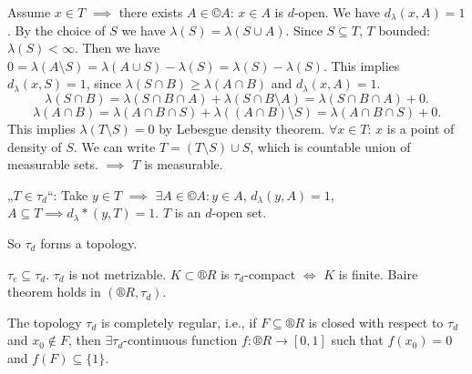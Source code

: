 \documentclass[12pt]{article}					%
\begin{document}
\begin{veta}
\begin{dukazin}
		Assume $x \in T$ $\implies$ there exists $A \in ©A$: $x \in A$ is $d$-open. We have $d_λ(x, A) = 1$. By the choice of $S$ we have $λ(S) = λ(S \cup A)$. Since $S \subseteq T$, $T$ bounded: $λ(S) < ∞$. Then we have $0 = λ(A \setminus S) = λ(A \cup S) - λ(S) = λ(S) - λ(S)$. This implies $d_λ(x, S) = 1$, since $λ(S \cap B) ≥ λ(A \cap B)$ and $d_λ(x, A) = 1$.
		$$ λ(S \cap B) = λ(S \cap B \cap A) + λ(S \cap B \setminus A) = λ(S \cap B \cap A) + 0. $$
		$$ λ(A \cap B) = λ(A \cap B \cap S) + λ((A \cap B) \setminus S) = λ(A \cap B \cap S) + 0. $$
		This implies $λ(T \setminus S) = 0$ by Lebesgue density theorem. $\forall x \in T$: $x$ is a point of density of $S$. We can write $T = (T \setminus S) \cup S$, which is countable union of measurable sets. $\implies$ $T$ is measurable.

		„$T \in τ_d$“: Take $y \in T$ $\implies$ $\exists A \in ©A: y \in A$, $d_λ(y, A) = 1$, $A \subseteq T \implies d_λ*(y, T) = 1$. $T$ is an $d$-open set.

		So $τ_d$ forms a topology.
	\end{dukazin}
\end{veta}

\begin{poznamka}[Properties of $τ_d$]
	$τ_e \subseteq τ_d$. $τ_d$ is not metrizable. $K \subset ®R$ is $τ_d$-compact $\Leftrightarrow$ $K$ is finite. Baire theorem holds in $(®R, τ_d)$.
\end{poznamka}

\begin{veta}
	The topology $τ_d$ is completely regular, i.e., if $F \subseteq ®R$ is closed with respect to $τ_d$ and $x_0 \notin F$, then $\exists τ_d$-continuous function $f: ®R \rightarrow [0, 1]$ such that $f(x_0) = 0$ and $f(F) \subseteq \{1\}$.
\end{veta}
\end{document}
